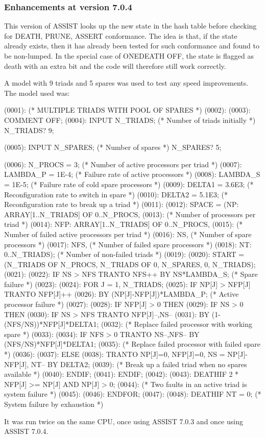 \subsubsection{Enhancements at version 7.0.4}

This version of ASSIST looks up the new state in the hash table
before checking for DEATH, PRUNE, ASSERT conformance.   The idea
is that, if the state already exists, then it has already been
tested for such conformance and found to be non-lumped.   In the
special case of ONEDEATH OFF, the state is flagged as death with
an extra bit and the code will therefore still work correctly.

A model with 9 triads and 5 spares was used to test any speed improvements.
The model used was:
\begin{logfileexample}
(0001): (*  MULTIPLE TRIADS WITH POOL OF SPARES *)
(0002): 
(0003): COMMENT OFF;
(0004): INPUT N_TRIADS;         (* Number of triads initially *)
N_TRIADS? 9;

(0005): INPUT N_SPARES;         (* Number of spares *)
N_SPARES? 5;

(0006): N_PROCS = 3;            (* Number of active processors per triad *)
(0007): LAMBDA_P = 1E-4;        (* Failure rate of active processors *)
(0008): LAMBDA_S = 1E-5;        (* Failure rate of cold spare processors *)
(0009): DELTA1 = 3.6E3;         (* Reconfiguration rate to switch in spare *)
(0010): DELTA2 = 5.1E3;         (* Reconfiguration rate to break up a triad *)
(0011): 
(0012): SPACE = (NP: ARRAY[1..N_TRIADS] OF 0..N_PROCS,
(0013):                              (* Number of processors per triad *)
(0014):          NFP: ARRAY[1..N_TRIADS] OF 0..N_PROCS,
(0015):                              (* Number of failed active processors per triad *)
(0016):          NS,                 (* Number of spare processors *)
(0017):          NFS,                (* Number of failed spare processors *)
(0018):          NT: 0..N_TRIADS);   (* Number of non-failed triads *)
(0019): 
(0020): START = (N_TRIADS OF N_PROCS, N_TRIADS OF 0, N_SPARES, 0, N_TRIADS);
(0021): 
(0022): IF NS > NFS TRANTO NFS++ BY NS*LAMBDA_S;  (* Spare failure *)
(0023): 
(0024): FOR J = 1, N_TRIADS;
(0025):    IF NP[J] > NFP[J] TRANTO NFP[J]++
(0026):         BY (NP[J]-NFP[J])*LAMBDA_P;  (* Active processor failure *)
(0027): 
(0028):    IF NFP[J] > 0 THEN
(0029):       IF NS > 0 THEN
(0030):          IF NS > NFS TRANTO NFP[J]--,NS--
(0031):             BY (1-(NFS/NS))*NFP[J]*DELTA1;
(0032):             (* Replace failed processor with working spare *)
(0033): 
(0034):          IF NFS > 0 TRANTO NS--,NFS-- BY (NFS/NS)*NFP[J]*DELTA1;
(0035):             (* Replace failed processor with failed spare *)
(0036): 
(0037):       ELSE
(0038):          TRANTO NP[J]=0, NFP[J]=0, NS = NP[J]-NFP[J], NT-- BY DELTA2;
(0039):             (* Break up a failed triad when no spares available *)
(0040):       ENDIF;
(0041):    ENDIF;
(0042): 
(0043):    DEATHIF 2 * NFP[J] >= NP[J] AND NP[J] > 0;
(0044):      (* Two faults in an active triad is system failure *)
(0045): 
(0046): ENDFOR;
(0047): 
(0048): DEATHIF NT = 0;    (* System failure by exhaustion *)
\end{logfileexample}
It was run twice on the same CPU, once using ASSIST 7.0.3 and once
using ASSIST 7.0.4.

